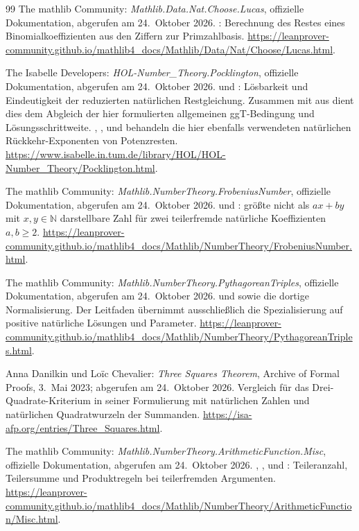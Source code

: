 \begin{thebibliography}{99}
The mathlib Community: \emph{Mathlib.Data.Nat.Choose.Lucas},
offizielle Dokumentation, abgerufen am 24.~Oktober 2026.
: Berechnung des Restes eines
Binomialkoeffizienten aus den Ziffern zur Primzahlbasis.
\url{https://leanprover-community.github.io/mathlib4_docs/Mathlib/Data/Nat/Choose/Lucas.html}.

The Isabelle Developers: \emph{HOL-Number\_Theory.Pocklington},
offizielle Dokumentation, abgerufen am 24.~Oktober 2026.
 und : Lösbarkeit und
Eindeutigkeit der reduzierten natürlichen Restgleichung.
Zusammen mit  aus
\cite{natchinese} dient dies dem Abgleich der hier formulierten
allgemeinen ggT-Bedingung und Lösungsschrittweite.
, ,
 und  behandeln die
hier ebenfalls verwendeten natürlichen Rückkehr-Exponenten
von Potenzresten.
\url{https://www.isabelle.in.tum.de/library/HOL/HOL-Number_Theory/Pocklington.html}.

The mathlib Community: \emph{Mathlib.NumberTheory.FrobeniusNumber},
offizielle Dokumentation, abgerufen am 24.~Oktober 2026.
 und :
größte nicht als $ax+by$ mit $x,y\in\mathbb N$ darstellbare Zahl
für zwei teilerfremde natürliche Koeffizienten $a,b\ge2$.
\url{https://leanprover-community.github.io/mathlib4_docs/Mathlib/NumberTheory/FrobeniusNumber.html}.

The mathlib Community: \emph{Mathlib.NumberTheory.PythagoreanTriples},
offizielle Dokumentation, abgerufen am 24.~Oktober 2026.
 und
 sowie die dortige
Normalisierung. Der Leitfaden übernimmt ausschließlich die
Spezialisierung auf positive natürliche Lösungen und Parameter.
\url{https://leanprover-community.github.io/mathlib4_docs/Mathlib/NumberTheory/PythagoreanTriples.html}.

Anna Danilkin und Loïc Chevalier: \emph{Three Squares Theorem},
Archive of Formal Proofs, 3.~Mai 2023; abgerufen am 24.~Oktober 2026.
Vergleich für das Drei-Quadrate-Kriterium in seiner Formulierung
mit natürlichen Zahlen und natürlichen Quadratwurzeln der Summanden.
\url{https://isa-afp.org/entries/Three_Squares.html}.

The mathlib Community: \emph{Mathlib.NumberTheory.ArithmeticFunction.Misc},
offizielle Dokumentation, abgerufen am 24.~Oktober 2026.
, ,
 und
: Teileranzahl, Teilersumme
und Produktregeln bei teilerfremden Argumenten.
\url{https://leanprover-community.github.io/mathlib4_docs/Mathlib/NumberTheory/ArithmeticFunction/Misc.html}.


\end{thebibliography}
